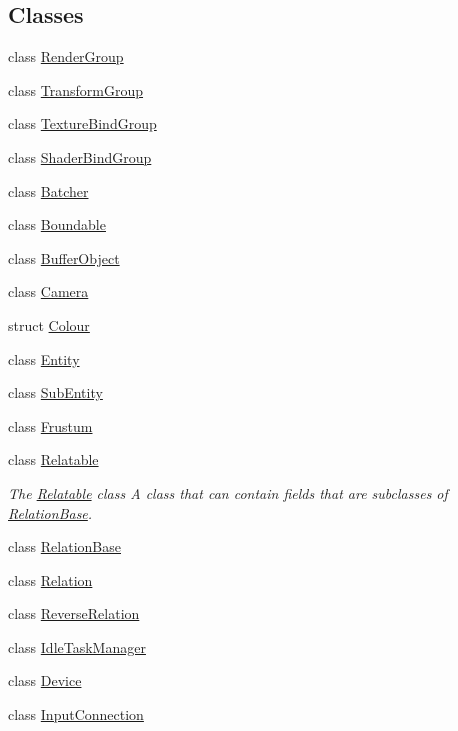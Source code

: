 \subsection*{Classes}
\begin{DoxyCompactItemize}
\item 
class \hyperlink{classkglt_1_1_render_group}{Render\-Group}
\item 
class \hyperlink{classkglt_1_1_transform_group}{Transform\-Group}
\item 
class \hyperlink{classkglt_1_1_texture_bind_group}{Texture\-Bind\-Group}
\item 
class \hyperlink{classkglt_1_1_shader_bind_group}{Shader\-Bind\-Group}
\item 
class \hyperlink{classkglt_1_1_batcher}{Batcher}
\item 
class \hyperlink{classkglt_1_1_boundable}{Boundable}
\item 
class \hyperlink{classkglt_1_1_buffer_object}{Buffer\-Object}
\item 
class \hyperlink{classkglt_1_1_camera}{Camera}
\item 
struct \hyperlink{structkglt_1_1_colour}{Colour}
\item 
class \hyperlink{classkglt_1_1_entity}{Entity}
\item 
class \hyperlink{classkglt_1_1_sub_entity}{Sub\-Entity}
\item 
class \hyperlink{classkglt_1_1_frustum}{Frustum}
\item 
class \hyperlink{classkglt_1_1_relatable}{Relatable}
\begin{DoxyCompactList}\small\item\em The \hyperlink{classkglt_1_1_relatable}{Relatable} class A class that can contain fields that are subclasses of \hyperlink{classkglt_1_1_relation_base}{Relation\-Base}. \end{DoxyCompactList}\item 
class \hyperlink{classkglt_1_1_relation_base}{Relation\-Base}
\item 
class \hyperlink{classkglt_1_1_relation}{Relation}
\item 
class \hyperlink{classkglt_1_1_reverse_relation}{Reverse\-Relation}
\item 
class \hyperlink{classkglt_1_1_idle_task_manager}{Idle\-Task\-Manager}
\item 
class \hyperlink{classkglt_1_1_device}{Device}
\item 
class \hyperlink{classkglt_1_1_input_connection}{Input\-Connection}
\item 

\end{DoxyCompactItemize}
